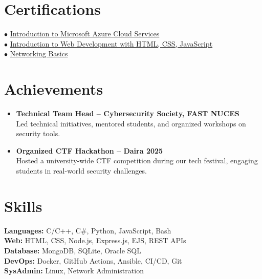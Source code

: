 \documentclass[a4paper,12pt]{article}
\begin{document}
\section{Certifications}
\begin{itemize}
$\bullet$ 
\href{https://coursera.org/verify/RS5DX85RBSMU}{Introduction to Microsoft Azure Cloud Services}\\
$\bullet$ \href{https://www.coursera.org/account/accomplishments/records/4KER8NU8582L}{Introduction to Web Development with HTML, CSS, JavaScript}\\
$\bullet$ 
\href{https://www.credly.com/badges/ec46484b-88ee-4142-a080-35a288bcc96d/linked_in_profile}{Networking Basics}
\end{itemize}
\section{Achievements}
\begin{itemize}
  \item \textbf{Technical Team Head – Cybersecurity Society, FAST NUCES} \\
  Led technical initiatives, mentored students, and organized workshops on security tools.

  \item \textbf{Organized CTF Hackathon – Daira 2025} \\
 Hosted a university-wide CTF competition during our tech festival, engaging students in real-world security challenges.
\end{itemize}

\section{Skills}
\hspace*{2em}\textbf{Languages:} C/C++, C\#, Python, JavaScript, Bash \\
\hspace*{2em}\textbf{Web:} HTML, CSS, Node.js, Express.js, EJS, REST APIs \\
\hspace*{2em}\textbf{Database:} MongoDB, SQLite, Oracle SQL \\
\hspace*{2em}\textbf{DevOps:} Docker, GitHub Actions, Ansible, CI/CD, Git \\
\hspace*{2em}\textbf{SysAdmin:} Linux, Network Administration
\end{document}
